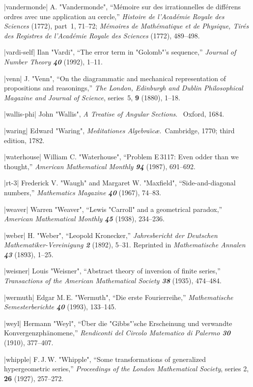 \bib|vandermonde|%
A. "Vandermonde", ``M\'emoire sur des irrationnelles de diff\'erens ordres
avec une application au cercle,''
{\sl Histoire de l'Acad\'emie Royale des Sciences\/} (1772), part~1, 71--72;
{\sl M\'emoires de Math\'ematique et de Physique, Tir\'es des
Registres de l'Acad\'emie Royale des Sciences\/} (1772), 489--498.

\bib|vardi-self|%
Ilan "Vardi", ``The error term in "Golomb"'s sequence,'' {\sl Journal of
Number Theory\/ \bf40} (1992), 1--11.

\bib|venn|%
J. "Venn", ``On the diagrammatic and mechanical representation of propositions
and reasonings,'' {\sl The London, Edinburgh and Dublin Philosophical
Magazine and Journal of Science}, series~5, {\bf9} (1880), 1--18.

\bib|wallis-phi|%
John "Wallis", {\sl A Treatise of Angular Sections}. \
Oxford, 1684.

\bib|waring|%
Edward "Waring", {\sl Meditationes Algebra{\"\i}c\ae}.\
Cambridge, 1770; third edition, 1782.

\bib|waterhouse|%
William C. "Waterhouse", ``Problem E\,3117: Even odder than we
thought,'' {\sl American Mathematical Monthly\/ \bf94} (1987), 691--692.

\bib|rt-3|%
Frederick V. "Waugh" and Margaret W. "Maxfield", ``Side-and-diagonal numbers,''
{\sl Mathematics Magazine\/ \bf40} (1967), 74--83.

\bib|weaver|%
Warren "Weaver", ``Lewis "Carroll" and a geometrical paradox,''
{\sl American Mathematical Monthly\/ \bf45} (1938), 234--236.

\bib|weber|%
H. "Weber", ``Leopold Kronecker,'' {\sl Jahresbericht der Deutschen
Mathe\-matiker-Vereinigung\/ \bf2} (1892), 5--31. Reprinted in
{\sl Mathematische Annalen\/ \bf43} (1893), 1--25.

\bib|weisner|%
Louis "Weisner", ``Abstract theory of inversion of finite series,''
{\sl Transactions of the American Mathematical Society\/ \bf38} (1935),
474--484.

\bib|wermuth|%
Edgar M.\,E. "Wermuth", ``Die erste Fourierreihe,'' {\sl Mathematische
Se\-mes\-ter\-berichte\/ \bf40} (1993), 133--145.

\bib|weyl|%
Hermann "Weyl", ``\"Uber die "Gibbs"'sche Erscheinung und
verwandte Konvergenzph\"anomene,'' {\sl Rendiconti del Circolo Matematico di
Palermo\/ \bf30} (1910), 377--407.

\bib|whipple|%
F.\,J.\,W. "Whipple", ``Some transformations of generalized hypergeometric
series,'' {\sl Proceedings of the London Mathematical Society}, series 2,
{\bf26} (1927), 257--272.


